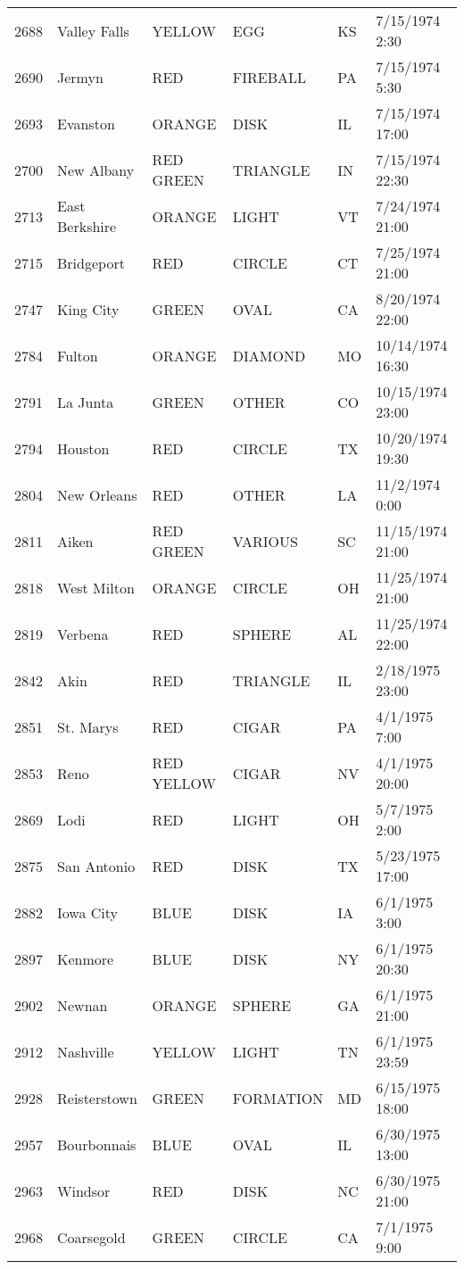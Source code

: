 \begin{tabular}{llllll}
2688 & Valley Falls & YELLOW & EGG & KS & 7/15/1974 2:30 \\
2690 & Jermyn & RED & FIREBALL & PA & 7/15/1974 5:30 \\
2693 & Evanston & ORANGE & DISK & IL & 7/15/1974 17:00 \\
2700 & New Albany & RED GREEN & TRIANGLE & IN & 7/15/1974 22:30 \\
2713 & East Berkshire & ORANGE & LIGHT & VT & 7/24/1974 21:00 \\
2715 & Bridgeport & RED & CIRCLE & CT & 7/25/1974 21:00 \\
2747 & King City & GREEN & OVAL & CA & 8/20/1974 22:00 \\
2784 & Fulton & ORANGE & DIAMOND & MO & 10/14/1974 16:30 \\
2791 & La Junta & GREEN & OTHER & CO & 10/15/1974 23:00 \\
2794 & Houston & RED & CIRCLE & TX & 10/20/1974 19:30 \\
2804 & New Orleans & RED & OTHER & LA & 11/2/1974 0:00 \\
2811 & Aiken & RED GREEN & VARIOUS & SC & 11/15/1974 21:00 \\
2818 & West Milton & ORANGE & CIRCLE & OH & 11/25/1974 21:00 \\
2819 & Verbena & RED & SPHERE & AL & 11/25/1974 22:00 \\
2842 & Akin & RED & TRIANGLE & IL & 2/18/1975 23:00 \\
2851 & St. Marys & RED & CIGAR & PA & 4/1/1975 7:00 \\
2853 & Reno & RED YELLOW & CIGAR & NV & 4/1/1975 20:00 \\
2869 & Lodi & RED & LIGHT & OH & 5/7/1975 2:00 \\
2875 & San Antonio & RED & DISK & TX & 5/23/1975 17:00 \\
2882 & Iowa City & BLUE & DISK & IA & 6/1/1975 3:00 \\
2897 & Kenmore & BLUE & DISK & NY & 6/1/1975 20:30 \\
2902 & Newnan & ORANGE & SPHERE & GA & 6/1/1975 21:00 \\
2912 & Nashville & YELLOW & LIGHT & TN & 6/1/1975 23:59 \\
2928 & Reisterstown & GREEN & FORMATION & MD & 6/15/1975 18:00 \\
2957 & Bourbonnais & BLUE & OVAL & IL & 6/30/1975 13:00 \\
2963 & Windsor & RED & DISK & NC & 6/30/1975 21:00 \\
2968 & Coarsegold & GREEN & CIRCLE & CA & 7/1/1975 9:00 \\

\end{tabular}
